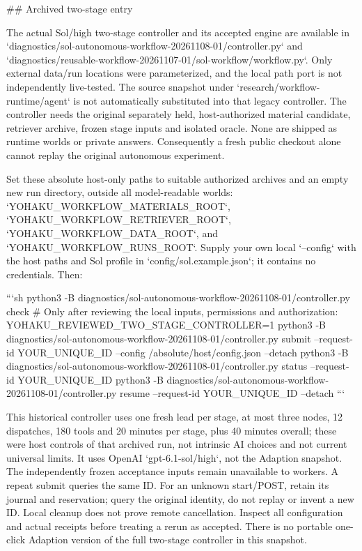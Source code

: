 ## Archived two-stage entry

The actual Sol/high two-stage controller and its accepted engine are available in `diagnostics/sol-autonomous-workflow-20261108-01/controller.py` and `diagnostics/reusable-workflow-20261107-01/sol-workflow/workflow.py`. Only external data/run locations were parameterized, and the local path port is not independently live-tested. The source snapshot under `research/workflow-runtime/agent` is not automatically substituted into that legacy controller. The controller needs the original separately held, host-authorized material candidate, retriever archive, frozen stage inputs and isolated oracle. None are shipped as runtime worlds or private answers. Consequently a fresh public checkout alone cannot replay the original autonomous experiment.

Set these absolute host-only paths to suitable authorized archives and an empty new run directory, outside all model-readable worlds: `YOHAKU_WORKFLOW_MATERIALS_ROOT`, `YOHAKU_WORKFLOW_RETRIEVER_ROOT`, `YOHAKU_WORKFLOW_DATA_ROOT`, and `YOHAKU_WORKFLOW_RUNS_ROOT`. Supply your own local `--config` with the host paths and Sol profile in `config/sol.example.json`; it contains no credentials. Then:

```sh
python3 -B diagnostics/sol-autonomous-workflow-20261108-01/controller.py check
# Only after reviewing the local inputs, permissions and authorization:
YOHAKU_REVIEWED_TWO_STAGE_CONTROLLER=1 python3 -B diagnostics/sol-autonomous-workflow-20261108-01/controller.py submit --request-id YOUR_UNIQUE_ID --config /absolute/host/config.json --detach
python3 -B diagnostics/sol-autonomous-workflow-20261108-01/controller.py status --request-id YOUR_UNIQUE_ID
python3 -B diagnostics/sol-autonomous-workflow-20261108-01/controller.py resume --request-id YOUR_UNIQUE_ID --detach
```

This historical controller uses one fresh lead per stage, at most three nodes, 12 dispatches, 180 tools and 20 minutes per stage, plus 40 minutes overall; these were host controls of that archived run, not intrinsic AI choices and not current universal limits. It uses OpenAI `gpt-6.1-sol/high`, not the Adaption snapshot. The independently frozen acceptance inputs remain unavailable to workers. A repeat submit queries the same ID. For an unknown start/POST, retain its journal and reservation; query the original identity, do not replay or invent a new ID. Local cleanup does not prove remote cancellation. Inspect all configuration and actual receipts before treating a rerun as accepted. There is no portable one-click Adaption version of the full two-stage controller in this snapshot.

